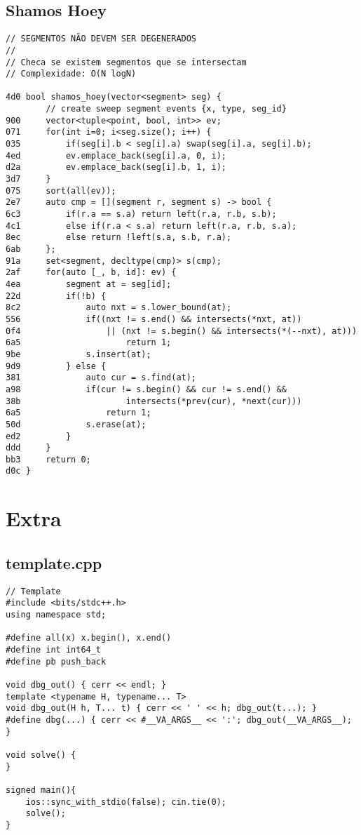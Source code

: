 \documentclass[11pt, a4paper, twoside]{article}
\begin{document}
\subsection{Shamos Hoey}
\begin{lstlisting}
// SEGMENTOS NÃO DEVEM SER DEGENERADOS
//
// Checa se existem segmentos que se intersectam
// Complexidade: O(N logN)

4d0 bool shamos_hoey(vector<segment> seg) {
    	// create sweep segment events {x, type, seg_id}
900 	vector<tuple<point, bool, int>> ev;
071 	for(int i=0; i<seg.size(); i++) {
035 		if(seg[i].b < seg[i].a) swap(seg[i].a, seg[i].b);
4ed 		ev.emplace_back(seg[i].a, 0, i);
d2a 		ev.emplace_back(seg[i].b, 1, i);
3d7 	}
075 	sort(all(ev));
2e7 	auto cmp = [](segment r, segment s) -> bool {
6c3 		if(r.a == s.a) return left(r.a, r.b, s.b);
4c1 		else if(r.a < s.a) return left(r.a, r.b, s.a);
8ec 		else return !left(s.a, s.b, r.a);
6ab 	};
91a 	set<segment, decltype(cmp)> s(cmp);
2af 	for(auto [_, b, id]: ev) {
4ea 		segment at = seg[id];
22d 		if(!b) {
8c2 			auto nxt = s.lower_bound(at);
556 			if((nxt != s.end() && intersects(*nxt, at))
0f4 				|| (nxt != s.begin() && intersects(*(--nxt), at)))
6a5 					return 1;
9be 			s.insert(at);
9d9 		} else {
381 			auto cur = s.find(at);
a98 			if(cur != s.begin() && cur != s.end() && 
38b 					intersects(*prev(cur), *next(cur))) 
6a5 				return 1;
50d 			s.erase(at);
ed2 		}
ddd 	}
bb3 	return 0;
d0c }
\end{lstlisting}

\pagebreak


%
%

\section{Extra}

\subsection{template.cpp}
\begin{lstlisting}
// Template
#include <bits/stdc++.h>
using namespace std;

#define all(x) x.begin(), x.end()
#define int int64_t
#define pb push_back

void dbg_out() { cerr << endl; }
template <typename H, typename... T>
void dbg_out(H h, T... t) { cerr << ' ' << h; dbg_out(t...); }
#define dbg(...) { cerr << #__VA_ARGS__ << ':'; dbg_out(__VA_ARGS__); }

void solve() {
}

signed main(){
	ios::sync_with_stdio(false); cin.tie(0);
	solve();
}
\end{lstlisting}
\end{document}
